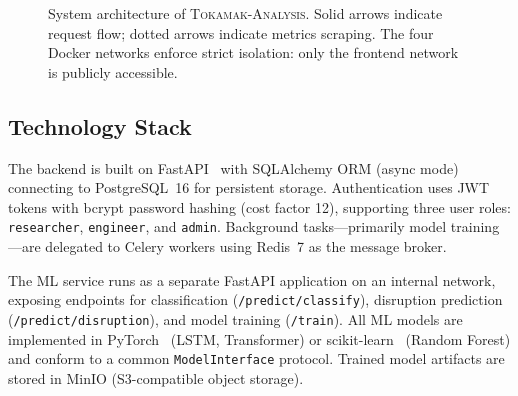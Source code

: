 \documentclass[twocolumn]{article}
\begin{document}
\begin{figure}[t]
\caption{System architecture of \textsc{Tokamak-Analysis}.
  Solid arrows indicate request flow; dotted arrows indicate
  metrics scraping. The four Docker networks enforce strict
  isolation: only the frontend network is publicly accessible.}
\label{fig:architecture}
\end{figure}

\subsection{Technology Stack}

The backend is built on FastAPI~\citep{fastapi} with
SQLAlchemy ORM (async mode) connecting to PostgreSQL~16
for persistent storage.
Authentication uses JWT tokens with bcrypt password hashing
(cost factor 12), supporting three user roles:
\texttt{researcher}, \texttt{engineer}, and \texttt{admin}.
Background tasks---primarily model training---are delegated
to Celery workers using Redis~7 as the message broker.

The ML service runs as a separate FastAPI application on an
internal network, exposing endpoints for classification
(\texttt{/predict/classify}), disruption prediction
(\texttt{/predict/disruption}), and model training
(\texttt{/train}).
All ML models are implemented in
PyTorch~\citep{paszke2019} (LSTM, Transformer) or
scikit-learn~\citep{pedregosa2011} (Random Forest) and
conform to a common \texttt{ModelInterface} protocol.
Trained model artifacts are stored in MinIO (S3-compatible
object storage).
\end{document}
